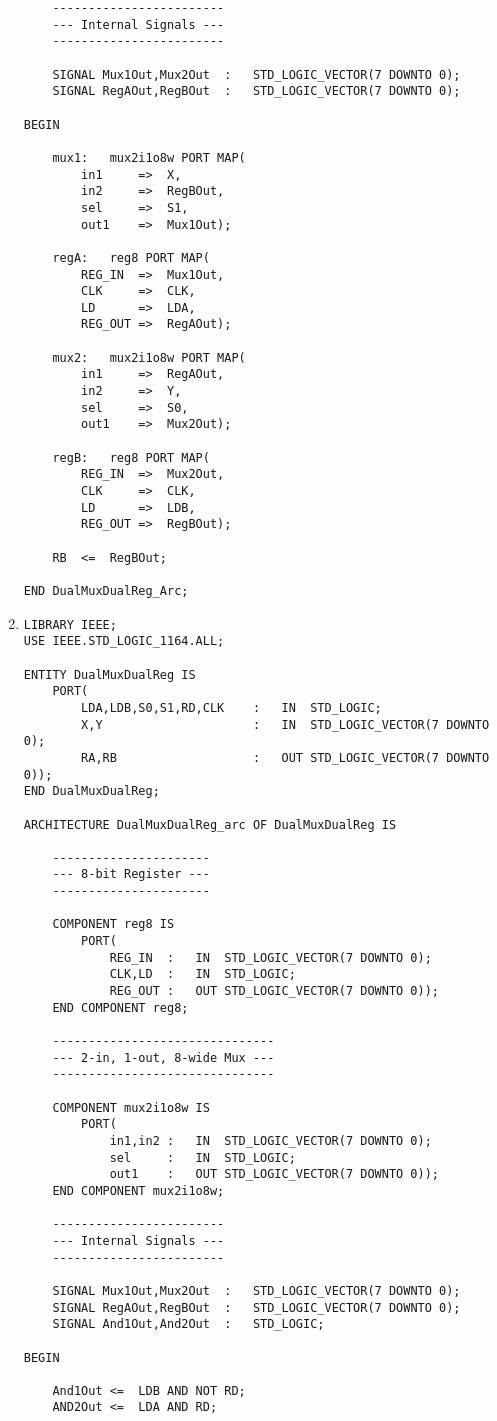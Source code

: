 \begin{enumerate}
\begin{lstlisting}
	------------------------
	--- Internal Signals ---
	------------------------

	SIGNAL Mux1Out,Mux2Out	:	STD_LOGIC_VECTOR(7 DOWNTO 0);
	SIGNAL RegAOut,RegBOut	:	STD_LOGIC_VECTOR(7 DOWNTO 0);

BEGIN

	mux1:	mux2i1o8w PORT MAP(
		in1		=>	X,
		in2		=>	RegBOut,
		sel		=>	S1,
		out1	=>	Mux1Out);

	regA:	reg8 PORT MAP(
		REG_IN	=>	Mux1Out,
		CLK		=>	CLK,
		LD		=>	LDA,
		REG_OUT	=>	RegAOut);

	mux2:	mux2i1o8w PORT MAP(
		in1		=>	RegAOut,
		in2		=>	Y,
		sel		=>	S0,
		out1	=>	Mux2Out);

	regB:	reg8 PORT MAP(
		REG_IN	=>	Mux2Out,
		CLK		=>	CLK,
		LD		=>	LDB,
		REG_OUT	=>	RegBOut);

	RB	<=	RegBOut;

END DualMuxDualReg_Arc;
	\end{lstlisting}

	\item \begin{lstlisting}
LIBRARY IEEE;
USE IEEE.STD_LOGIC_1164.ALL;

ENTITY DualMuxDualReg IS
	PORT(
		LDA,LDB,S0,S1,RD,CLK	:	IN	STD_LOGIC;
		X,Y						:	IN	STD_LOGIC_VECTOR(7 DOWNTO 0);
		RA,RB					:	OUT	STD_LOGIC_VECTOR(7 DOWNTO 0));
END DualMuxDualReg;

ARCHITECTURE DualMuxDualReg_arc OF DualMuxDualReg IS

	----------------------
	--- 8-bit Register ---
	----------------------

	COMPONENT reg8 IS
		PORT(
			REG_IN	:	IN	STD_LOGIC_VECTOR(7 DOWNTO 0);
			CLK,LD	:	IN	STD_LOGIC;
			REG_OUT	:	OUT	STD_LOGIC_VECTOR(7 DOWNTO 0));
	END COMPONENT reg8;

	-------------------------------
	--- 2-in, 1-out, 8-wide Mux ---
	-------------------------------

	COMPONENT mux2i1o8w IS
		PORT(
			in1,in2	:	IN	STD_LOGIC_VECTOR(7 DOWNTO 0);
			sel		:	IN	STD_LOGIC;
			out1	:	OUT	STD_LOGIC_VECTOR(7 DOWNTO 0));
	END COMPONENT mux2i1o8w;

	------------------------
	--- Internal Signals ---
	------------------------

	SIGNAL Mux1Out,Mux2Out	:	STD_LOGIC_VECTOR(7 DOWNTO 0);
	SIGNAL RegAOut,RegBOut	:	STD_LOGIC_VECTOR(7 DOWNTO 0);
	SIGNAL And1Out,And2Out	:	STD_LOGIC;

BEGIN

	And1Out	<=	LDB AND NOT RD;
	AND2Out	<=	LDA AND RD;


\end{lstlisting}
\end{enumerate}

